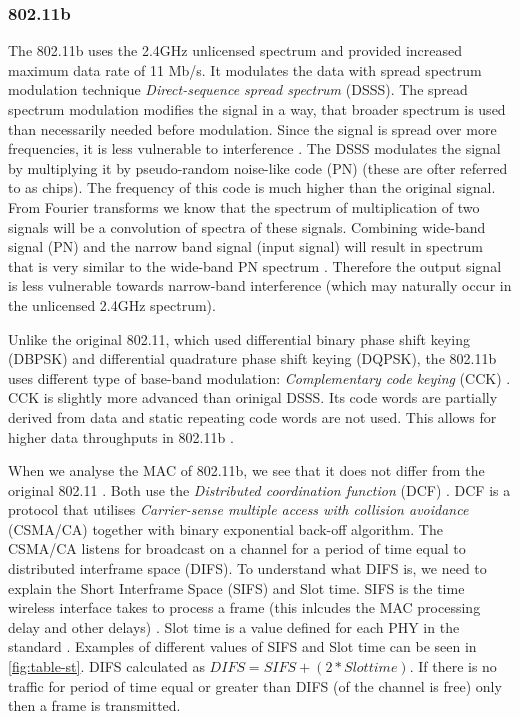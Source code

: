 \subsubsection{802.11b} \label{802.11b}
% 
The 802.11b uses the 2.4GHz unlicensed spectrum and provided increased maximum data rate of 11 Mb/s. It  modulates the data with spread spectrum modulation technique \emph{Direct-sequence spread spectrum} (DSSS). The spread spectrum modulation modifies the signal in a way, that broader spectrum is used than necessarily needed before modulation. Since the signal is spread over more frequencies, it is less vulnerable to interference \cite{MaximIntegratedProductsInc.2013AnMaxim}. The DSSS modulates the signal by multiplying it by pseudo-random  noise-like code (PN) (these are ofter referred to as chips). The frequency of this code is much higher than the original signal. From Fourier transforms we know that the spectrum of multiplication of two signals will be a convolution of spectra of these signals. Combining wide-band signal (PN) and the narrow band signal (input signal) will result in spectrum that is very similar to the wide-band PN spectrum \cite{Haykin2001CommunicationSystems}. Therefore the output signal is less vulnerable towards narrow-band interference (which may naturally occur in the unlicensed 2.4GHz spectrum).\par
% 
Unlike the original 802.11, which used differential binary phase shift keying (DBPSK) and differential quadrature phase shift keying (DQPSK), the 802.11b uses different type of base-band modulation: \emph{Complementary code keying} (CCK) \cite{2016IEEEAccess.} \cite{Aboul-Magd2008WirelessPerspective}.
CCK is slightly more advanced than orinigal DSSS. Its code words are partially derived from data and static repeating code words are not used. This allows for higher data throughputs in 802.11b \cite{Gast2002802.11Guide}.\par
% 
When we analyse the MAC of 802.11b, we see that it does not differ from the original 802.11 \cite{Gast2002802.11Guide}. Both use the \emph{Distributed coordination function} (DCF) \cite{Hiertz2010TheUniverse}. DCF is a protocol that utilises \emph{Carrier-sense multiple access with collision avoidance} (CSMA/CA) together with binary exponential back-off algorithm. The CSMA/CA listens for broadcast on a channel for a period of time equal to distributed interframe space (DIFS). To understand what DIFS is, we need to explain the Short Interframe Space (SIFS) and Slot time. SIFS is the time wireless interface takes to process a frame (this inlcudes the MAC processing delay and other delays) \cite{2016IEEEAccess.}. Slot time is a value defined for each PHY in the standard \cite{2016IEEEAccess.}. Examples of different values of SIFS and Slot time can be seen in \ref{fig:table-st}. DIFS calculated as \(DIFS = SIFS + ( 2 * Slot time)\). If there is no traffic for period of time equal or greater than DIFS (of the channel is free) only then a frame is transmitted.\par
